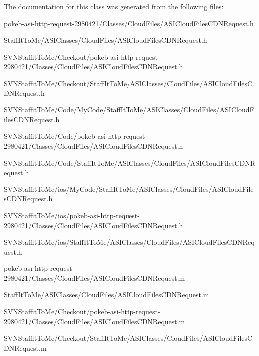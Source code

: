 \-The documentation for this class was generated from the following files\-:\begin{DoxyCompactItemize}
\item 
pokeb-\/asi-\/http-\/request-\/2980421/\-Classes/\-Cloud\-Files/\-A\-S\-I\-Cloud\-Files\-C\-D\-N\-Request.\-h\item 
\-Staff\-It\-To\-Me/\-A\-S\-I\-Classes/\-Cloud\-Files/\-A\-S\-I\-Cloud\-Files\-C\-D\-N\-Request.\-h\item 
\-S\-V\-N\-Staffit\-To\-Me/\-Checkout/pokeb-\/asi-\/http-\/request-\/2980421/\-Classes/\-Cloud\-Files/\-A\-S\-I\-Cloud\-Files\-C\-D\-N\-Request.\-h\item 
\-S\-V\-N\-Staffit\-To\-Me/\-Checkout/\-Staff\-It\-To\-Me/\-A\-S\-I\-Classes/\-Cloud\-Files/\-A\-S\-I\-Cloud\-Files\-C\-D\-N\-Request.\-h\item 
\-S\-V\-N\-Staffit\-To\-Me/\-Code/\-My\-Code/\-Staff\-It\-To\-Me/\-A\-S\-I\-Classes/\-Cloud\-Files/\-A\-S\-I\-Cloud\-Files\-C\-D\-N\-Request.\-h\item 
\-S\-V\-N\-Staffit\-To\-Me/\-Code/pokeb-\/asi-\/http-\/request-\/2980421/\-Classes/\-Cloud\-Files/\-A\-S\-I\-Cloud\-Files\-C\-D\-N\-Request.\-h\item 
\-S\-V\-N\-Staffit\-To\-Me/\-Code/\-Staff\-It\-To\-Me/\-A\-S\-I\-Classes/\-Cloud\-Files/\-A\-S\-I\-Cloud\-Files\-C\-D\-N\-Request.\-h\item 
\-S\-V\-N\-Staffit\-To\-Me/ios/\-My\-Code/\-Staff\-It\-To\-Me/\-A\-S\-I\-Classes/\-Cloud\-Files/\-A\-S\-I\-Cloud\-Files\-C\-D\-N\-Request.\-h\item 
\-S\-V\-N\-Staffit\-To\-Me/ios/pokeb-\/asi-\/http-\/request-\/2980421/\-Classes/\-Cloud\-Files/\-A\-S\-I\-Cloud\-Files\-C\-D\-N\-Request.\-h\item 
\-S\-V\-N\-Staffit\-To\-Me/ios/\-Staff\-It\-To\-Me/\-A\-S\-I\-Classes/\-Cloud\-Files/\-A\-S\-I\-Cloud\-Files\-C\-D\-N\-Request.\-h\item 
pokeb-\/asi-\/http-\/request-\/2980421/\-Classes/\-Cloud\-Files/\-A\-S\-I\-Cloud\-Files\-C\-D\-N\-Request.\-m\item 
\-Staff\-It\-To\-Me/\-A\-S\-I\-Classes/\-Cloud\-Files/\-A\-S\-I\-Cloud\-Files\-C\-D\-N\-Request.\-m\item 
\-S\-V\-N\-Staffit\-To\-Me/\-Checkout/pokeb-\/asi-\/http-\/request-\/2980421/\-Classes/\-Cloud\-Files/\-A\-S\-I\-Cloud\-Files\-C\-D\-N\-Request.\-m\item 
\-S\-V\-N\-Staffit\-To\-Me/\-Checkout/\-Staff\-It\-To\-Me/\-A\-S\-I\-Classes/\-Cloud\-Files/\-A\-S\-I\-Cloud\-Files\-C\-D\-N\-Request.\-m\item 

\end{DoxyCompactItemize}
